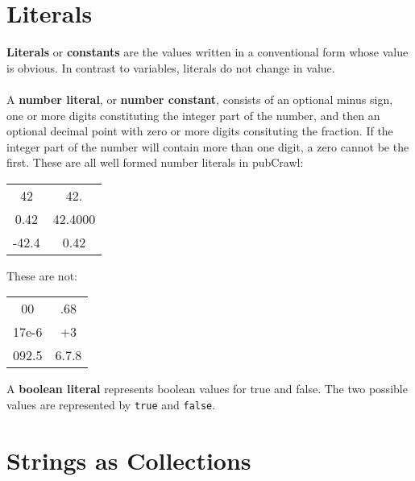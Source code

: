 \documentclass[oneside]{book}
\begin{document}
\section{Literals}
\textbf{Literals} or \textbf{constants} are the values written in a conventional form whose value is obvious. In contrast to variables, literals do not change in value.\\\\
A \textbf{number literal}, or \textbf{number constant}, consists of an optional minus sign, one or more digits constituting the integer part of the number, and then an optional decimal point with zero or more digits consituting the fraction. If the integer part of the number will contain more than one digit, a zero cannot be the first. These are all well formed number literals in pubCrawl: 
\begin{center}
  \begin{tabular}{c c}
  42&42.\\
  0.42&42.4000\\
  -42.4&0.42\\
  \end{tabular}
\end{center}
These are not: 
\begin{center}
  \begin{tabular}{c c}
  00&.68\\
  17e-6&+3\\
  092.5&6.7.8\\
  \end{tabular}
\end{center}
A \textbf{boolean literal} represents boolean values for true and false. The two possible values are represented by \texttt{true} and \texttt{false}.

\section{Strings as Collections}
\end{document}
